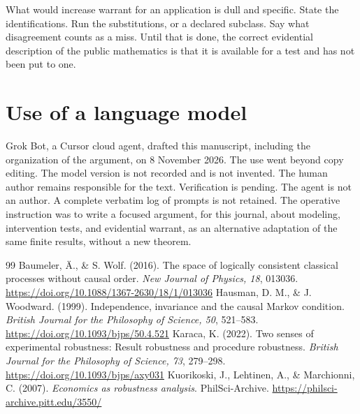 \documentclass[11pt]{article}
\begin{document}
What would increase warrant for an application is dull and specific. State the identifications. Run the substitutions, or a declared subclass. Say what disagreement counts as a miss. Until that is done, the correct evidential description of the public mathematics is that it is available for a test and has not been put to one.

\section*{Use of a language model}
Grok Bot, a Cursor cloud agent, drafted this manuscript, including the organization of the argument, on 8 November 2026. The use went beyond copy editing. The model version is not recorded and is not invented. The human author remains responsible for the text. Verification is pending. The agent is not an author. A complete verbatim log of prompts is not retained. The operative instruction was to write a focused argument, for this journal, about modeling, intervention tests, and evidential warrant, as an alternative adaptation of the same finite results, without a new theorem.

\begin{thebibliography}{99}
 Baumeler, \"A., \& S. Wolf. (2016). The space of logically consistent classical processes without causal order. \textit{New Journal of Physics, 18}, 013036. \url{https://doi.org/10.1088/1367-2630/18/1/013036}
 Hausman, D. M., \& J. Woodward. (1999). Independence, invariance and the causal Markov condition. \textit{British Journal for the Philosophy of Science, 50}, 521--583. \url{https://doi.org/10.1093/bjps/50.4.521}
 Karaca, K. (2022). Two senses of experimental robustness: Result robustness and procedure robustness. \textit{British Journal for the Philosophy of Science, 73}, 279--298. \url{https://doi.org/10.1093/bjps/axy031}
 Kuorikoski, J., Lehtinen, A., \& Marchionni, C. (2007). \textit{Economics as robustness analysis}. PhilSci-Archive. \url{https://philsci-archive.pitt.edu/3550/}
\end{thebibliography}
\end{document}
